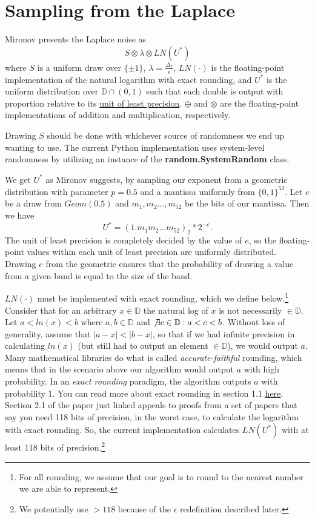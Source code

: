 \documentclass[11pt]{scrartcl} %
\begin{document}
\section{Sampling from the Laplace}
\label{sec:sampling_from_laplace}
Mironov presents the Laplace noise as
\[ S \otimes \lambda \otimes LN(U^*) \]
where $S$ is a uniform draw over $\{\pm 1\}$, $\lambda = \frac{\Delta_f}{\epsilon}$, $LN(\cdot)$ is the floating-point implementation of the natural logarithm with exact rounding, and $U^*$ is the uniform distribution over $\mathbb{D} \cap (0,1)$ such that each double is output with proportion relative to its \href{https://en.wikipedia.org/wiki/Unit_in_the_last_place}{unit of least precision}. $\oplus$ and $\otimes$ are the floating-point implementations of addition and multiplication, respectively. \newline

Drawing $S$ should be done with whichever source of randomness we end up wanting to use. The current Python implementation uses system-level randomness by utilizing an instance of the \textbf{random.SystemRandom} class. \newline

We get $U^*$ as Mironov suggests, by sampling our exponent from a geometric distribution with parameter $p = 0.5$ and a mantissa uniformly from $\{0,1\}^{52}$. Let $e$ be a draw from $Geom(0.5)$ and $m_1, m_2 \hdots, m_{52}$ be the bits of our mantissa. Then we have
\[ U^{*} = (1.m_1m_2 \hdots m_{52})_2 * 2^{- e}. \]
The unit of least precision is completely decided by the value of $e$, so the floating-point values within each unit of least precision are uniformly distributed. Drawing $e$ from the geometric ensures that the probability of drawing a value from a given band is equal to the size of the band. \newline

$LN(\cdot)$ must be implemented with exact rounding, which we define below.\footnote{For all rounding, we assume that our goal is to round to the nearest number we are able to represent.} Consider that for an arbitrary $x \in \mathbb{D}$ the natural log of $x$ is not necessarily $\in \mathbb{D}$. Let $a < ln(x) < b$ where $a,b \in \mathbb{D}$ and $\not\exists c \in \mathbb{D}: a < c < b$. Without loss of generality, assume that $\vert a-x \vert < \vert b - x \vert$, so that if we had infinite precision in calculating $ln(x)$ (but still had to output an element $\in \mathbb{D}$), we would output $a$.
Many mathematical libraries do what is called \textit{accurate-faithful} rounding, which means that in the scenario above our algorithm would output $a$ with high probability. In an \textit{exact rounding} paradigm, the algorithm outputs $a$ with probability 1. You can read more about exact rounding in section 1.1 \href{http://www.ens-lyon.fr/LIP/Pub/Rapports/RR/RR2005/RR2005-37.pdf}{here}. Section 2.1 of the paper just linked appeals to proofs from a set of papers that say you need 118 bits of precision, in the worst case, to calculate the logarithm with exact rounding. So, the current implementation calculates $LN(U^*)$ with at least 118 bits of precision.\footnote{We potentially use $> 118$ because of the $\epsilon$ redefinition described later.} \newline
\end{document}

